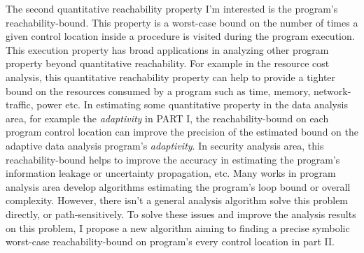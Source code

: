 

The second quantitative reachability property I'm interested is the program's reachability-bound.
This property is a worst-case bound on the number of times a given control location 
 inside a procedure is visited during the program execution.
This execution property has broad
applications in analyzing other program property beyond quantitative reachability.
For example in the resource cost analysis, this quantitative reachability property
can help to provide a tighter
bound on the resources consumed by a program such as time, memory,
network-traffic, power etc.
In estimating some quantitative property
in the data analysis area, for example the \emph{adaptivity}
in PART I, the reachability-bound on each program control location
can improve the precision of the estimated bound on the adaptive data analysis program's \emph{adaptivity}.
In security analysis area, this reachability-bound helps to improve the accuracy
in estimating the program's information leakage or uncertainty propagation, etc.
Many works in program analysis area develop algorithms estimating the program's loop bound or overall complexity.
However, there isn't a general analysis algorithm solve this problem directly, or path-sensitively.
To solve these issues and improve the analysis results on this problem, I propose a new algorithm
aiming to finding a precise symbolic worst-case reachability-bound on program's every control location
in part II.



